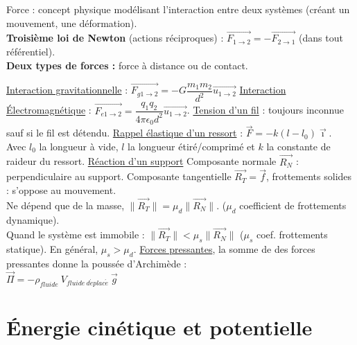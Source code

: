 \documentclass[13pt, twoside, a4paper, french]{report}
\begin{document}
                Force : concept physique modélisant l'interaction entre deux systèmes (créant un mouvement, une déformation).\\

                \textbf{Troisième loi de Newton} (actions réciproques) : $\overrightarrow{F_{1\rightarrow2}} = - \overrightarrow{F_{2\rightarrow1}}$ (dans tout référentiel).\\

                \textbf{Deux types de forces :} force à distance ou de contact.
                \begin{outline}
                    \1 \underline{Interaction gravitationnelle} : $\overrightarrow{F_{g1\rightarrow2}} = - G\dfrac{m_1 m_2}{d^2}\overrightarrow{u_{1\rightarrow2}}$
                    \1 \underline{Interaction Électromagnétique} : $\overrightarrow{F_{e1\rightarrow2}} = \dfrac{q_1 q_2}{4\pi\epsilon_0 d^2}\overrightarrow{u_{1\rightarrow2}}$.
                    \1 \underline{Tension d'un fil} : toujours inconnue sauf si le fil est détendu.
                    \1 \underline{Rappel élastique d'un ressort} : $\vec{F} = - k (l - l_0)\vec{\imath}$.\\Avec $l_0$ la longueur à vide, $l$ la longueur étiré/comprimé et $k$ la constante de raideur du ressort.
                    \1 \underline{Réaction d'un support}
                    \2 Composante normale $\overrightarrow{R_N}$ : perpendiculaire au support.
                    \2 Composante tangentielle $\overrightarrow{R_T} = \overrightarrow{f}$, frottements solides : s'oppose au mouvement.\\Ne dépend que de la masse, $\|\overrightarrow{R_T}\| = \mu_d \|\overrightarrow{R_N}\|$. ($\mu_d$ coefficient de frottements dynamique).\\Quand le système est immobile : $\|\overrightarrow{R_T}\| < \mu_s \|\overrightarrow{R_N}\|$ ($\mu_s$ coef. frottements statique). En général, $\mu_s > \mu_d$.
                    \1 \underline{Forces pressantes}, la somme de des forces pressantes donne la poussée d'Archimède :
                    \\$\overrightarrow{\Pi} = - \rho_{fluide}\ V_{fluide \ d\acute eplac\acute e}\ \vec{g}$
                \end{outline}


        \section{Énergie cinétique et potentielle}\label{sec:energie-cinetique-et-potentielle}
\end{document}
